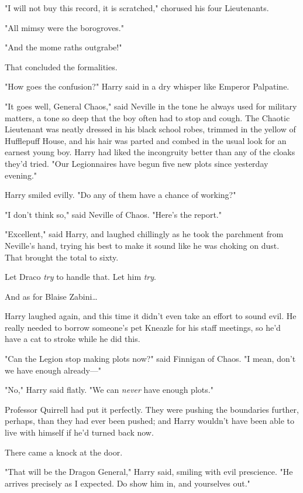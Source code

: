 "I will not buy this record, it is scratched," chorused his four Lieutenants.

"All mimsy were the borogroves."

"And the mome raths outgrabe!"

That concluded the formalities.

"How goes the confusion?" Harry said in a dry whisper like Emperor Palpatine.

"It goes well, General Chaos," said Neville in the tone he always used for 
military matters, a tone so deep that the boy often had to stop and cough. The 
Chaotic Lieutenant was neatly dressed in his black school robes, trimmed in the 
yellow of Hufflepuff House, and his hair was parted and combed in the usual 
look for an earnest young boy. Harry had liked the incongruity better than any 
of the cloaks they'd tried. "Our Legionnaires have begun five new plots since 
yesterday evening."

Harry smiled evilly. "Do any of them have a chance of working?"

"I don't think so," said Neville of Chaos. "Here's the report."

"Excellent," said Harry, and laughed chillingly as he took the parchment from 
Neville's hand, trying his best to make it sound like he was choking on dust. 
That brought the total to sixty.

Let Draco \emph{try} to handle that. Let him \emph{try}.

And as for Blaise Zabini{\ldots}

Harry laughed again, and this time it didn't even take an effort to sound evil. 
He really needed to borrow someone's pet Kneazle for his staff meetings, so 
he'd have a cat to stroke while he did this.

"Can the Legion stop making plots now?" said Finnigan of Chaos. "I mean, don't 
we have enough already---"

"No," Harry said flatly. "We can \emph{never} have enough plots."

Professor Quirrell had put it perfectly. They were pushing the boundaries 
further, perhaps, than they had ever been pushed; and Harry wouldn't have been 
able to live with himself if he'd turned back now.

There came a knock at the door.

"That will be the Dragon General," Harry said, smiling with evil prescience. 
"He arrives precisely as I expected. Do show him in, and yourselves out."

